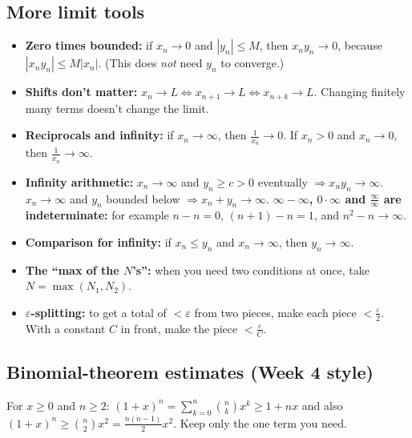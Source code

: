 \documentclass[11pt]{article}
\theoremstyle{definition}
\newcommand{\eps}{\varepsilon}
\newcommand{\key}[1]{\textcolor{red!70!black}{\textbf{#1}}}
\begin{document}
\subsection{More limit tools}
\begin{itemize}
  \item \textbf{Zero times bounded:} if $x_n\to0$ and $|y_n|\le M$, then
        $x_ny_n\to0$, because $|x_ny_n|\le M|x_n|$. (This does \emph{not}
        need $y_n$ to converge.)
  \item \textbf{Shifts don't matter:} $x_n\to L\iff x_{n+1}\to L\iff x_{n+k}\to L$.
        Changing finitely many terms doesn't change the limit.
  \item \textbf{Reciprocals and infinity:} if $x_n\to\infty$, then
        $\frac1{x_n}\to0$. If $x_n>0$ and $x_n\to0$, then $\frac1{x_n}\to\infty$.
  \item \textbf{Infinity arithmetic:} $x_n\to\infty$ and $y_n\ge c>0$
        eventually $\Rightarrow x_ny_n\to\infty$. $x_n\to\infty$ and
        $y_n$ bounded below $\Rightarrow x_n+y_n\to\infty$.
        \key{$\infty-\infty$, $0\cdot\infty$ and $\frac\infty\infty$ are
        indeterminate:} for example $n-n=0$, $(n+1)-n=1$, and $n^2-n\to\infty$.
  \item \textbf{Comparison for infinity:} if $x_n\le y_n$ and
        $x_n\to\infty$, then $y_n\to\infty$.
  \item \textbf{The ``max of the $N$'s'':} when you need two conditions at
        once, take $N=\max(N_1,N_2)$.
  \item \textbf{$\eps$-splitting:} to get a total of $<\eps$ from two pieces,
        make each piece $<\frac\eps2$. With a constant $C$ in front, make the
        piece $<\frac{\eps}{C}$.
\end{itemize}

\subsection{Binomial-theorem estimates (Week 4 style)}
For $x\ge0$ and $n\ge2$:
$(1+x)^n=\sum_{k=0}^n\binom nk x^k\ge 1+nx$ and also
$(1+x)^n\ge\binom n2x^2=\frac{n(n-1)}2x^2$.
Keep only the one term you need.
\end{document}
